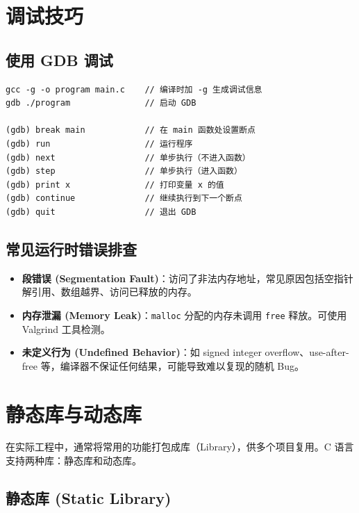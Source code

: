 \section{调试技巧}

\subsection{使用 GDB 调试}

\begin{lstlisting}[caption={GDB 基本命令}]
gcc -g -o program main.c    // 编译时加 -g 生成调试信息
gdb ./program               // 启动 GDB

(gdb) break main            // 在 main 函数处设置断点
(gdb) run                   // 运行程序
(gdb) next                  // 单步执行（不进入函数）
(gdb) step                  // 单步执行（进入函数）
(gdb) print x               // 打印变量 x 的值
(gdb) continue              // 继续执行到下一个断点
(gdb) quit                  // 退出 GDB
\end{lstlisting}

\subsection{常见运行时错误排查}

\begin{itemize}
    \item \textbf{段错误 (Segmentation Fault)}：访问了非法内存地址，常见原因包括空指针解引用、数组越界、访问已释放的内存。
    \item \textbf{内存泄漏 (Memory Leak)}：\texttt{malloc} 分配的内存未调用 \texttt{free} 释放。可使用 Valgrind 工具检测。
    \item \textbf{未定义行为 (Undefined Behavior)}：如 signed integer overflow、use-after-free 等，编译器不保证任何结果，可能导致难以复现的随机 Bug。
\end{itemize}

\section{静态库与动态库}

在实际工程中，通常将常用的功能打包成库（Library），供多个项目复用。C 语言支持两种库：静态库和动态库。

\subsection{静态库 (Static Library)}

